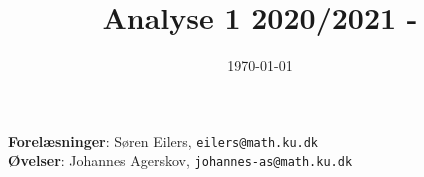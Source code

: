 \documentclass{article}
\title{Analyse 1 2020/2021 -}
\author{}
\date{\vspace{-1cm}\today}
\begin{document}
\maketitle

\noindent
\textbf{Forelæsninger}: S\o{}ren Eilers, \texttt{eilers@math.ku.dk} \\
\textbf{Øvelser}: Johannes Agerskov, \texttt{johannes-as@math.ku.dk}




%
%
%
%
%
%
%
%
%


\end{document}
